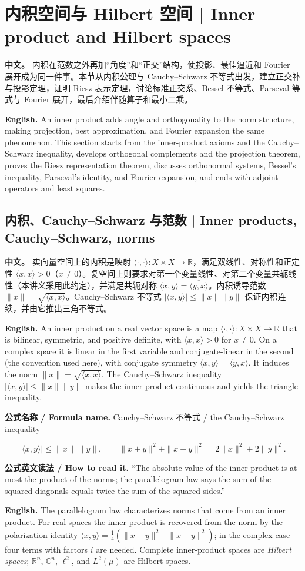 \documentclass[UTF8,11pt,a4paper]{ctexart}
\newcommand{\EN}[1]{\par\noindent \textbf{English.} #1\par}
\newcommand{\READ}[1]{\par\noindent \textbf{公式英文读法 / How to read it.} #1\par}
\newcommand{\FORMULA}[2]{\par\noindent\textbf{公式名称 / Formula name.} #1 / #2\par}
\newcommand{\APS}[2]{\par\noindent\textbf{中文。} #1\par\noindent\textbf{English.} #2\par\smallskip}
\begin{document}
\section{内积空间与 Hilbert 空间 | Inner product and Hilbert spaces}
\APS{内积在范数之外再加“角度”和“正交”结构，使投影、最佳逼近和 Fourier 展开成为同一件事。本节从内积公理与 Cauchy--Schwarz 不等式出发，建立正交补与投影定理，证明 Riesz 表示定理，讨论标准正交系、Bessel 不等式、Parseval 等式与 Fourier 展开，最后介绍伴随算子和最小二乘。}{An inner product adds angle and orthogonality to the norm structure, making projection, best approximation, and Fourier expansion the same phenomenon. This section starts from the inner-product axioms and the Cauchy--Schwarz inequality, develops orthogonal complements and the projection theorem, proves the Riesz representation theorem, discusses orthonormal systems, Bessel's inequality, Parseval's identity, and Fourier expansion, and ends with adjoint operators and least squares.}

\subsection{内积、Cauchy--Schwarz 与范数 | Inner products, Cauchy--Schwarz, norms}
\APS{实向量空间上的内积是映射 $\langle\cdot,\cdot\rangle:X\times X\to\mathbb R$，满足双线性、对称性和正定性 $\langle x,x\rangle>0$（$x\ne0$）。复空间上则要求对第一个变量线性、对第二个变量共轭线性（本讲义采用此约定），并满足共轭对称 $\langle x,y\rangle=\overline{\langle y,x\rangle}$。内积诱导范数 $\|x\|=\sqrt{\langle x,x\rangle}$。Cauchy--Schwarz 不等式 $|\langle x,y\rangle|\le\|x\|\|y\|$ 保证内积连续，并由它推出三角不等式。}{An inner product on a real vector space is a map $\langle\cdot,\cdot\rangle:X\times X\to\mathbb R$ that is bilinear, symmetric, and positive definite, with $\langle x,x\rangle>0$ for $x\ne0$. On a complex space it is linear in the first variable and conjugate-linear in the second (the convention used here), with conjugate symmetry $\langle x,y\rangle=\overline{\langle y,x\rangle}$. It induces the norm $\|x\|=\sqrt{\langle x,x\rangle}$. The Cauchy--Schwarz inequality $|\langle x,y\rangle|\le\|x\|\|y\|$ makes the inner product continuous and yields the triangle inequality.}
\FORMULA{Cauchy--Schwarz 不等式}{the Cauchy--Schwarz inequality}
\[
|\langle x,y\rangle|\le\|x\|\,\|y\|,
\qquad
\|x+y\|^2+\|x-y\|^2=2\|x\|^2+2\|y\|^2.
\]
\READ{``The absolute value of the inner product is at most the product of the norms; the parallelogram law says the sum of the squared diagonals equals twice the sum of the squared sides.''}
\EN{The parallelogram law characterizes norms that come from an inner product. For real spaces the inner product is recovered from the norm by the polarization identity $\langle x,y\rangle=\frac14(\|x+y\|^2-\|x-y\|^2)$; in the complex case four terms with factors $i$ are needed. Complete inner-product spaces are \emph{Hilbert spaces}; $\mathbb R^n$, $\mathbb C^n$, $\ell^2$, and $L^2(\mu)$ are Hilbert spaces.}
\end{document}

